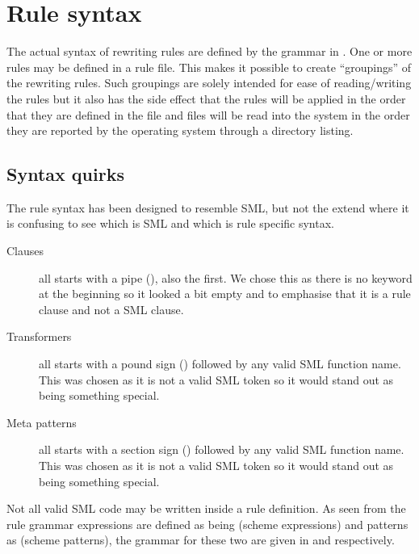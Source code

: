 \section{Rule syntax}
\label{sec:rule-syntax}
The actual syntax of rewriting rules are defined by the grammar in
. One or more rules may be defined in a rule file. This
makes it possible to create ``groupings'' of the rewriting rules. Such groupings
are solely intended for ease of reading/writing the rules but it also has the
side effect that the rules will be applied in the order that they are defined in
the file and files will be read into the system in the order they are reported
by the operating system through a directory listing.

\subsection{Syntax quirks}

The rule syntax has been designed to resemble SML, but not the extend where it
is confusing to see which is SML and which is rule specific syntax.

\begin{description}
\item[Clauses] all starts with a pipe (\ttt{|}), also the first. We chose this as
  there is no  keyword at the beginning so it looked a bit empty and to
  emphasise that it is a rule clause and not a SML clause.

\item[Transformers] all starts with a pound sign () followed by any valid
  SML function name. This was chosen as it is not a valid SML token so it would
  stand out as being something special.

\item[Meta patterns] all starts with a section sign () followed by any
  valid SML function name. This was chosen as it is not a valid SML token so it
  would stand out as being something special.
\end{description}

Not all valid SML code may be written inside a rule definition. As seen from the
rule grammar expressions are defined as being  (scheme expressions)
and patterns as  (scheme patterns), the grammar for these two are
given in  and 
respectively.

